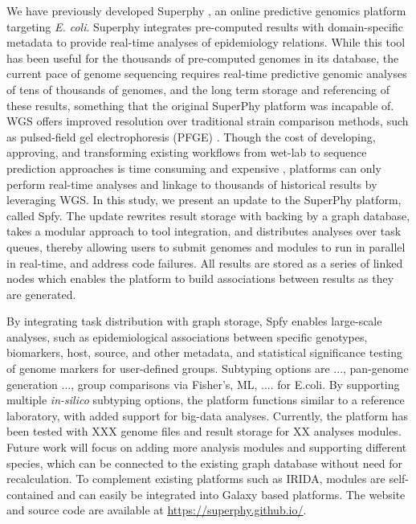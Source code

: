 \documentclass[a4,center,fleqn]{NAR}
\begin{document}
We have previously developed Superphy \cite{whiteside2016superphy}, an online predictive genomics platform targeting \textit{E. coli}.
Superphy integrates pre-computed results with domain-specific metadata to provide real-time analyses of epidemiology relations.
While this tool has been useful for the thousands of pre-computed genomes in its database, the current pace of genome sequencing requires real-time predictive genomic analyses of tens of thousands of genomes, and the long term storage and referencing of these results, something that the original SuperPhy platform was incapable of.
WGS offers improved resolution over traditional strain comparison methods, such as pulsed-field gel electrophoresis (PFGE) \cite{ronholm2016navigating}.
Though the cost of developing, approving, and transforming existing workflows from wet-lab to sequence prediction approaches is time consuming and expensive \cite{koser2012routine}, platforms can only perform real-time analyses and linkage to thousands of historical results by leveraging WGS.
In this study, we present an update to the SuperPhy platform, called Spfy.
The update rewrites result storage with backing by a graph database, takes a modular approach to tool integration, and distributes analyses over task queues, thereby allowing users to submit genomes and modules to run in parallel in real-time, and address code failures.
All results are stored as a series of linked nodes which enables the platform to build associations between results as they are generated. \par

By integrating task distribution with graph storage, Spfy enables large-scale analyses, such as epidemiological associations between specific genotypes, biomarkers, host, source, and other metadata, and statistical significance testing of genome markers for user-defined groups.
Subtyping options are ..., pan-genome generation ..., group comparisons via Fisher's, ML, .... for E.coli.
By supporting multiple \textit{in-silico} subtyping options, the platform functions similar to a reference laboratory, with added support for big-data analyses.
Currently, the platform has been tested with XXX genome files and result storage for XX analyses modules.
Future work will focus on adding more analysis modules and supporting different species, which can be connected to the existing graph database without need for recalculation.
To complement existing platforms such as IRIDA, modules are self-contained and can easily be integrated into Galaxy \cite{goecks2010galaxy} based platforms.
The website and source code are available at \url{https://superphy.github.io/}. \par
\end{document}
